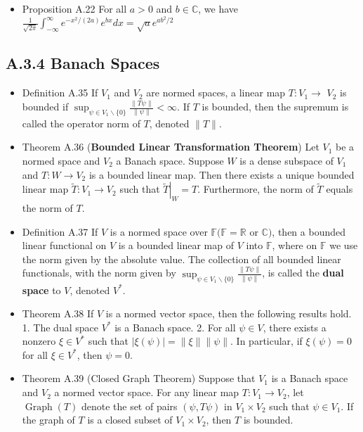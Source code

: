 \begin{itemize}
\item Proposition A.22 For all $a>0$ and $b \in \mathbb{C}$, we have $\frac{1}{\sqrt{2 \pi}} \int_{-\infty}^{\infty} e^{-x^{2} /(2 a)} e^{b x} d x=\sqrt{a} e^{a b^{2} / 2}$
\end{itemize}

\subsection{A.3.4 Banach Spaces}
\begin{itemize}
\item Definition A.35 If $V_{1}$ and $V_{2}$ are normed spaces, a linear map $T: V_{1} \rightarrow$ $V_{2}$ is bounded if $\sup _{\psi \in V_{1} \backslash\{0\}} \frac{\|T \psi\|}{\|\psi\|}<\infty$. If $T$ is bounded, then the supremum is called the operator norm of $T$, denoted $\|T\|$.

\item Theorem A.36 (\textbf{Bounded Linear Transformation Theorem}) Let $V_{1}$ be a normed space and $V_{2}$ a Banach space. Suppose $W$ is a dense subspace of $V_{1}$ and $T: W \rightarrow V_{2}$ is a bounded linear map. Then there exists a unique bounded linear map $\tilde{T}: V_{1} \rightarrow V_{2}$ such that $\left.\tilde{T}\right|_{W}=T$. Furthermore, the norm of $\tilde{T}$ equals the norm of $T$.

\item Definition A.37 If $V$ is a normed space over $\mathbb{F}(\mathbb{F}=\mathbb{R}$ or $\mathbb{C})$, then a bounded linear functional on $V$ is a bounded linear map of $V$ into $\mathbb{F}$, where on $\mathbb{F}$ we use the norm given by the absolute value. The collection of all bounded linear functionals, with the norm given by $\sup _{\psi \in V_{1} \backslash\{0\}} \frac{\|T \psi\|}{\|\psi\|}$, is called the \textbf{dual space} to $V$, denoted $V^{*}$.

\item Theorem A.38 If $V$ is a normed vector space, then the following results hold.
1. The dual space $V^{*}$ is a Banach space.
2. For all $\psi \in V$, there exists a nonzero $\xi \in V^{*}$ such that $|\xi(\psi)|=\|\xi\|\|\psi\|$. In particular, if $\xi(\psi)=0$ for all $\xi \in V^{*}$, then $\psi=0$.

\item Theorem A.39 (Closed Graph Theorem) Suppose that $V_{1}$ is a Banach space and $V_{2}$ a normed vector space. For any linear map $T: V_{1} \rightarrow V_{2}$, let $\operatorname{Graph}(T)$ denote the set of pairs $(\psi, T \psi)$ in $V_{1} \times V_{2}$ such that $\psi \in V_{1}$. If the graph of $T$ is a closed subset of $V_{1} \times V_{2}$, then $T$ is bounded.
\end{itemize}

